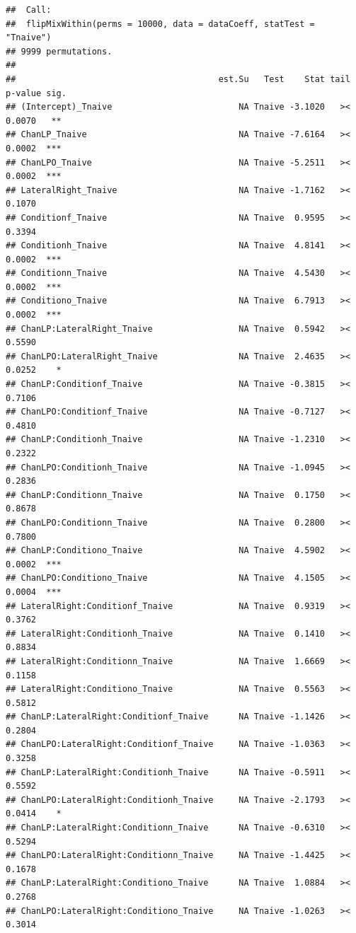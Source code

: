 \documentclass[
]{article}
\begin{document}
\begin{verbatim}
##  Call:
##  flipMixWithin(perms = 10000, data = dataCoeff, statTest = "Tnaive") 
## 9999 permutations.
## 
##                                        est.Su   Test    Stat tail p-value sig.
## (Intercept)_Tnaive                         NA Tnaive -3.1020   ><  0.0070   **
## ChanLP_Tnaive                              NA Tnaive -7.6164   ><  0.0002  ***
## ChanLPO_Tnaive                             NA Tnaive -5.2511   ><  0.0002  ***
## LateralRight_Tnaive                        NA Tnaive -1.7162   ><  0.1070     
## Conditionf_Tnaive                          NA Tnaive  0.9595   ><  0.3394     
## Conditionh_Tnaive                          NA Tnaive  4.8141   ><  0.0002  ***
## Conditionn_Tnaive                          NA Tnaive  4.5430   ><  0.0002  ***
## Conditiono_Tnaive                          NA Tnaive  6.7913   ><  0.0002  ***
## ChanLP:LateralRight_Tnaive                 NA Tnaive  0.5942   ><  0.5590     
## ChanLPO:LateralRight_Tnaive                NA Tnaive  2.4635   ><  0.0252    *
## ChanLP:Conditionf_Tnaive                   NA Tnaive -0.3815   ><  0.7106     
## ChanLPO:Conditionf_Tnaive                  NA Tnaive -0.7127   ><  0.4810     
## ChanLP:Conditionh_Tnaive                   NA Tnaive -1.2310   ><  0.2322     
## ChanLPO:Conditionh_Tnaive                  NA Tnaive -1.0945   ><  0.2836     
## ChanLP:Conditionn_Tnaive                   NA Tnaive  0.1750   ><  0.8678     
## ChanLPO:Conditionn_Tnaive                  NA Tnaive  0.2800   ><  0.7800     
## ChanLP:Conditiono_Tnaive                   NA Tnaive  4.5902   ><  0.0002  ***
## ChanLPO:Conditiono_Tnaive                  NA Tnaive  4.1505   ><  0.0004  ***
## LateralRight:Conditionf_Tnaive             NA Tnaive  0.9319   ><  0.3762     
## LateralRight:Conditionh_Tnaive             NA Tnaive  0.1410   ><  0.8834     
## LateralRight:Conditionn_Tnaive             NA Tnaive  1.6669   ><  0.1158     
## LateralRight:Conditiono_Tnaive             NA Tnaive  0.5563   ><  0.5812     
## ChanLP:LateralRight:Conditionf_Tnaive      NA Tnaive -1.1426   ><  0.2804     
## ChanLPO:LateralRight:Conditionf_Tnaive     NA Tnaive -1.0363   ><  0.3258     
## ChanLP:LateralRight:Conditionh_Tnaive      NA Tnaive -0.5911   ><  0.5592     
## ChanLPO:LateralRight:Conditionh_Tnaive     NA Tnaive -2.1793   ><  0.0414    *
## ChanLP:LateralRight:Conditionn_Tnaive      NA Tnaive -0.6310   ><  0.5294     
## ChanLPO:LateralRight:Conditionn_Tnaive     NA Tnaive -1.4425   ><  0.1678     
## ChanLP:LateralRight:Conditiono_Tnaive      NA Tnaive  1.0884   ><  0.2768     
## ChanLPO:LateralRight:Conditiono_Tnaive     NA Tnaive -1.0263   ><  0.3014
\end{verbatim}
\end{document}

